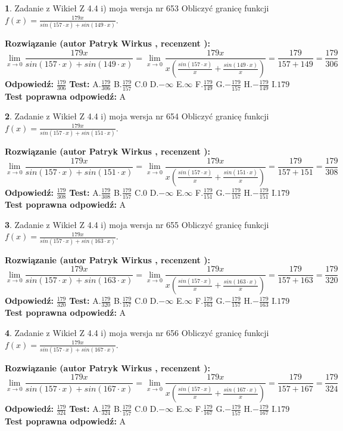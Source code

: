 \documentclass[12pt, a4paper]{article}
\theoremstyle{definition} %
\newtheorem{zad}{}
\newcommand{\zadStart}[1]{\begin{zad}#1\newline}
\newcommand{\zadStop}{\end{zad}}
\newcommand{\rozwStart}[2]{\noindent \textbf{Rozwiązanie (autor #1 , recenzent #2): }\newline}
\newcommand{\rozwStop}{\newline}
\newcommand{\odpStart}{\noindent \textbf{Odpowiedź:}\newline}
\newcommand{\odpStop}{\newline}
\newcommand{\testStart}{\noindent \textbf{Test:}\newline}
\newcommand{\testStop}{\newline}
\newcommand{\kluczStart}{\noindent \textbf{Test poprawna odpowiedź:}\newline}
\newcommand{\kluczStop}{\newline}
\begin{document}
\zadStart{Zadanie z Wikieł Z 4.4 i) moja wersja nr 653}
Obliczyć granicę funkcji $f(x)=\frac{179x}{sin(157\cdot x) +sin(149\cdot x)}$.
\zadStop
\rozwStart{Patryk Wirkus}{}
$$\lim\limits_{x\to 0}\frac{179x}{sin(157\cdot x) +sin(149\cdot x)}=\lim\limits_{x\to 0}\frac{179x}{x(\frac{sin(157\cdot x)}{x}+\frac{sin(149\cdot x)}{x})}=\frac{179}{157+149} = \frac{179}{306}$$
\rozwStop
\odpStart
$\frac{179}{306}$
\odpStop
\testStart
A.$\frac{179}{306}$
B.$\frac{179}{157}$
C.$0$
D.$-\infty$
E.$\infty$
F.$\frac{179}{149}$
G.$-\frac{179}{157}$
H.$-\frac{179}{149}$
I.$179$
\testStop
\kluczStart
A
\kluczStop



\zadStart{Zadanie z Wikieł Z 4.4 i) moja wersja nr 654}
Obliczyć granicę funkcji $f(x)=\frac{179x}{sin(157\cdot x) +sin(151\cdot x)}$.
\zadStop
\rozwStart{Patryk Wirkus}{}
$$\lim\limits_{x\to 0}\frac{179x}{sin(157\cdot x) +sin(151\cdot x)}=\lim\limits_{x\to 0}\frac{179x}{x(\frac{sin(157\cdot x)}{x}+\frac{sin(151\cdot x)}{x})}=\frac{179}{157+151} = \frac{179}{308}$$
\rozwStop
\odpStart
$\frac{179}{308}$
\odpStop
\testStart
A.$\frac{179}{308}$
B.$\frac{179}{157}$
C.$0$
D.$-\infty$
E.$\infty$
F.$\frac{179}{151}$
G.$-\frac{179}{157}$
H.$-\frac{179}{151}$
I.$179$
\testStop
\kluczStart
A
\kluczStop



\zadStart{Zadanie z Wikieł Z 4.4 i) moja wersja nr 655}
Obliczyć granicę funkcji $f(x)=\frac{179x}{sin(157\cdot x) +sin(163\cdot x)}$.
\zadStop
\rozwStart{Patryk Wirkus}{}
$$\lim\limits_{x\to 0}\frac{179x}{sin(157\cdot x) +sin(163\cdot x)}=\lim\limits_{x\to 0}\frac{179x}{x(\frac{sin(157\cdot x)}{x}+\frac{sin(163\cdot x)}{x})}=\frac{179}{157+163} = \frac{179}{320}$$
\rozwStop
\odpStart
$\frac{179}{320}$
\odpStop
\testStart
A.$\frac{179}{320}$
B.$\frac{179}{157}$
C.$0$
D.$-\infty$
E.$\infty$
F.$\frac{179}{163}$
G.$-\frac{179}{157}$
H.$-\frac{179}{163}$
I.$179$
\testStop
\kluczStart
A
\kluczStop



\zadStart{Zadanie z Wikieł Z 4.4 i) moja wersja nr 656}
Obliczyć granicę funkcji $f(x)=\frac{179x}{sin(157\cdot x) +sin(167\cdot x)}$.
\zadStop
\rozwStart{Patryk Wirkus}{}
$$\lim\limits_{x\to 0}\frac{179x}{sin(157\cdot x) +sin(167\cdot x)}=\lim\limits_{x\to 0}\frac{179x}{x(\frac{sin(157\cdot x)}{x}+\frac{sin(167\cdot x)}{x})}=\frac{179}{157+167} = \frac{179}{324}$$
\rozwStop
\odpStart
$\frac{179}{324}$
\odpStop
\testStart
A.$\frac{179}{324}$
B.$\frac{179}{157}$
C.$0$
D.$-\infty$
E.$\infty$
F.$\frac{179}{167}$
G.$-\frac{179}{157}$
H.$-\frac{179}{167}$
I.$179$
\testStop
\kluczStart
A
\kluczStop
\end{document}
